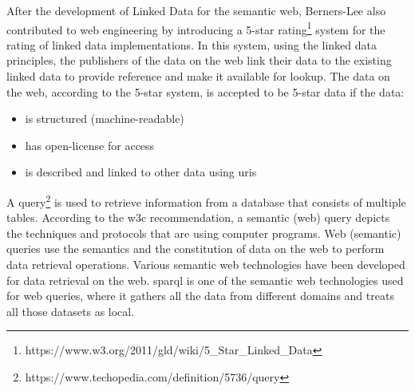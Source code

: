 \begin{doublespace}
After the development of Linked Data for the semantic web, 
Berners-Lee also contributed to web engineering by introducing a 5-star rating\footnote{https://www.w3.org/2011/gld/wiki/5\_Star\_Linked\_Data} system for the rating of linked data implementations. 
In this system, using the linked data principles, the publishers of the data on the web link their data to the existing linked data to provide reference and make it available for lookup. The data on the web, according to the 5-star system, is accepted to be 5-star data if the data:

\begin{itemize}
  \item is structured (machine-readable)
  \item has open-license for access
  \item is described and linked to other data using \ac{uri}s
\end{itemize}


A query\footnote{https://www.techopedia.com/definition/5736/query} is used to retrieve information from a database that consists of multiple tables. 
According to the \ac{w3c} recommendation, a semantic (web) query depicts the techniques and protocols that are  using computer programs. Web (semantic) queries use the semantics and the constitution of data on the web to perform data retrieval operations. Various semantic web technologies have been developed for data retrieval on the web. \ac{sparql} is one of the semantic web technologies used for web queries, where it gathers all the data from different domains and treats all those datasets as local.


\end{doublespace}
